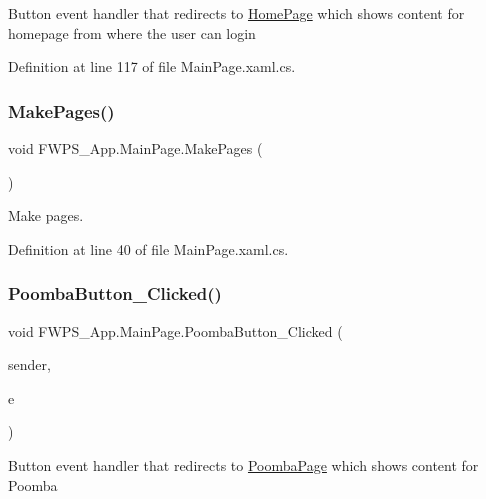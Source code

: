 Button event handler that redirects to \mbox{\hyperlink{class_f_w_p_s___app_1_1_home_page}{Home\+Page}} which shows content for homepage from where the user can login 

Definition at line 117 of file Main\+Page.\+xaml.\+cs.

\mbox{\label{class_f_w_p_s___app_1_1_main_page_ae361695a2f61f022f35a3d0afb9be4ef}} 
\subsubsection{\texorpdfstring{Make\+Pages()}{MakePages()}}
{\footnotesize\ttfamily void F\+W\+P\+S\+\_\+\+App.\+Main\+Page.\+Make\+Pages (\begin{DoxyParamCaption}{ }\end{DoxyParamCaption})}



Make pages. 



Definition at line 40 of file Main\+Page.\+xaml.\+cs.

\mbox{\label{class_f_w_p_s___app_1_1_main_page_a90fa536c6b12549ecc557f8f5c39e3b6}} 
\subsubsection{\texorpdfstring{Poomba\+Button\+\_\+\+Clicked()}{PoombaButton\_Clicked()}}
{\footnotesize\ttfamily void F\+W\+P\+S\+\_\+\+App.\+Main\+Page.\+Poomba\+Button\+\_\+\+Clicked (\begin{DoxyParamCaption}\item[{object}]{sender,  }\item[{Event\+Args}]{e }\end{DoxyParamCaption})\hspace{0.3cm}{\ttfamily [private]}}

Button event handler that redirects to \mbox{\hyperlink{class_f_w_p_s___app_1_1_poomba_page}{Poomba\+Page}} which shows content for Poomba 

